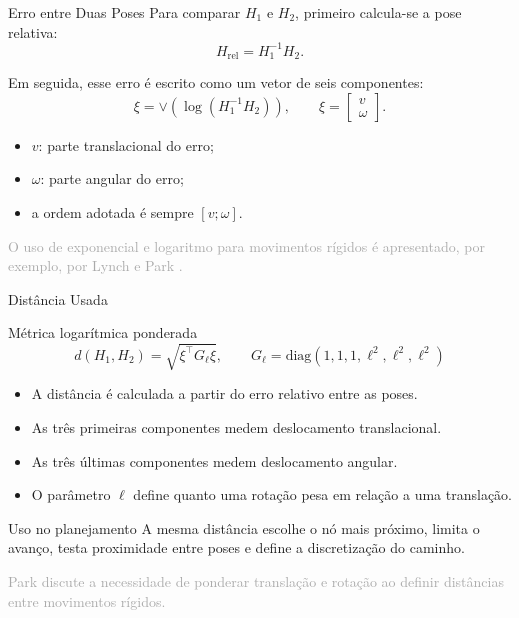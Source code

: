 \documentclass[aspectratio=169]{beamer}
\newcommand{\smalltag}[1]{\textcolor{darkgray}{\scriptsize #1}}
\begin{document}
\begin{frame}{Erro entre Duas Poses}
    \small
    Para comparar \(H_1\) e \(H_2\), primeiro calcula-se a pose relativa:
    \[
    H_{\mathrm{rel}} = H_1^{-1}H_2.
    \]

    Em seguida, esse erro é escrito como um vetor de seis componentes:
    \[
    \xi =
    \vee\left(
    \log(H_1^{-1}H_2)
    \right),
    \qquad
    \xi =
    \begin{bmatrix}
    v \\
    \omega
    \end{bmatrix}.
    \]

    \begin{itemize}
        \item \(v\): parte translacional do erro;
        \item \(\omega\): parte angular do erro;
        \item a ordem adotada é sempre \([v;\omega]\).
    \end{itemize}

    \smalltag{O uso de exponencial e logaritmo para movimentos rígidos é apresentado, por exemplo, por Lynch e Park \cite{LynchPark2017}.}
\end{frame}

\begin{frame}{Distância Usada}
    \begin{block}{Métrica logarítmica ponderada}
        \[
        d(H_1,H_2)
        =
        \sqrt{\xi^\top G_\ell \xi},
        \qquad
        G_\ell =
        \mathrm{diag}(1,1,1,\ell^2,\ell^2,\ell^2)
        \]
    \end{block}

    \vspace{0.15cm}
    \begin{itemize}
        \item A distância é calculada a partir do erro relativo entre as poses.
        \item As três primeiras componentes medem deslocamento translacional.
        \item As três últimas componentes medem deslocamento angular.
        \item O parâmetro \(\ell\) define quanto uma rotação pesa em relação a uma translação.
    \end{itemize}

    \vspace{0.15cm}
    \begin{block}{Uso no planejamento}
        A mesma distância escolhe o nó mais próximo, limita o avanço, testa
        proximidade entre poses e define a discretização do caminho.
    \end{block}

    \vfill
    \smalltag{Park \cite{Park1995} discute a necessidade de ponderar translação e rotação ao definir distâncias entre movimentos rígidos.}
\end{frame}
\end{document}
